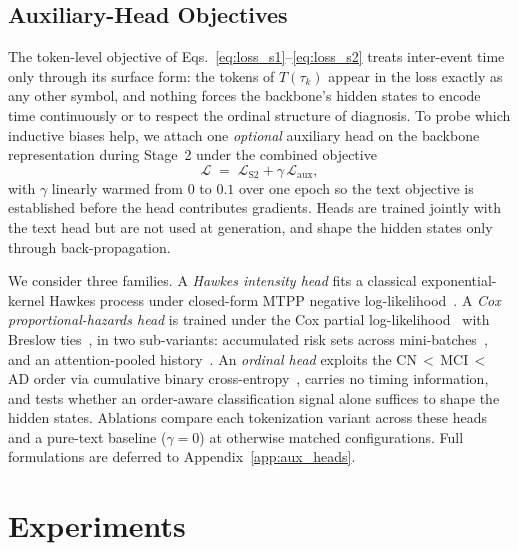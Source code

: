 \documentclass{article}
\begin{document}
\subsection{Auxiliary-Head Objectives}
\label{sec:regularization}

The token-level objective of Eqs.~\eqref{eq:loss_s1}--\eqref{eq:loss_s2} treats inter-event time only through its surface form: the tokens of $T(\tau_k)$ appear in the loss exactly as any other symbol, and nothing forces the backbone's hidden states to encode time continuously or to respect the ordinal structure of diagnosis.
To probe which inductive biases help, we attach one \emph{optional} auxiliary head on the backbone representation during Stage~2 under the combined objective
\begin{equation}
    \mathcal{L} \;=\; \mathcal{L}_{\text{S2}} + \gamma\, \mathcal{L}_{\text{aux}},
    \label{eq:combined}
\end{equation}
with $\gamma$ linearly warmed from $0$ to $0.1$ over one epoch so the text objective is established before the head contributes gradients.
Heads are trained jointly with the text head but are not used at generation, and shape the hidden states only through back-propagation.

We consider three families. A \emph{Hawkes intensity head} fits a classical exponential-kernel Hawkes process under closed-form MTPP negative log-likelihood~\citep{hawkes1971spectra,ogata1981lewis,shchur2021neural,berghaus2026incontext}. A \emph{Cox proportional-hazards head} is trained under the Cox partial log-likelihood~\citep{cox1972regression} with Breslow ties~\citep{breslow1972contribution}, in two sub-variants: accumulated risk sets across mini-batches~\citep{katzman2018deepsurv,kvamme2019time}, and an attention-pooled history~\citep{lin2017structured}. An \emph{ordinal head} exploits the CN\,$<$\,MCI\,$<$\,AD order via cumulative binary cross-entropy~\citep{frank2001simple,niu2016ordinal}, carries no timing information, and tests whether an order-aware classification signal alone suffices to shape the hidden states.
Ablations compare each tokenization variant across these heads and a pure-text baseline ($\gamma=0$) at otherwise matched configurations. Full formulations are deferred to Appendix~\ref{app:aux_heads}.

\section{Experiments}
\label{sec:experiments}
\end{document}
